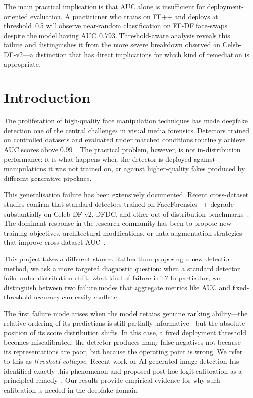 \documentclass[a4paper,12pt]{report}
\begin{document}
The main practical implication is that AUC alone is
insufficient for deployment-oriented evaluation.
A practitioner who trains on FF++ and deploys at
threshold~0.5 will observe near-random classification on
FF-DF face-swaps despite the model having AUC~0.793.
Threshold-aware analysis reveals this failure and
distinguishes it from the more severe breakdown observed
on Celeb-DF-v2---a distinction that has direct implications
for which kind of remediation is appropriate.

\chapter{Introduction}

The proliferation of high-quality face manipulation
techniques has made deepfake detection one of the central
challenges in visual media forensics.
Detectors trained on controlled datasets and evaluated
under matched conditions routinely achieve AUC scores
above 0.99~\cite{rossler2019,deepfakebench}.
The practical problem, however, is not in-distribution
performance: it is what happens when the detector is
deployed against manipulations it was not trained on, or
against higher-quality fakes produced by different
generative pipelines.

This generalisation failure has been extensively documented.
Recent cross-dataset studies confirm that standard detectors
trained on FaceForensics++ degrade substantially on
Celeb-DF-v2, DFDC, and other out-of-distribution
benchmarks~\cite{tolosana2020,deepfakebench,gend2025}.
The dominant response in the research community has been
to propose new training objectives, architectural
modifications, or data augmentation strategies that
improve cross-dataset AUC~\cite{gend2025,lsda2024,p_and_p2025}.

This project takes a different stance.
Rather than proposing a new detection method, we ask a
more targeted diagnostic question: when a standard detector
fails under distribution shift, what kind of failure is it?
In particular, we distinguish between two failure modes that
aggregate metrics like AUC and fixed-threshold accuracy
can easily conflate.

The first failure mode arises when the model retains genuine
ranking ability---the relative ordering of its predictions
is still partially informative---but the absolute position
of its score distribution shifts.
In this case, a fixed deployment threshold becomes
miscalibrated: the detector produces many false negatives
not because its representations are poor, but because the
operating point is wrong.
We refer to this as \emph{threshold collapse}.
Recent work on AI-generated image detection has identified
exactly this phenomenon and proposed post-hoc logit
calibration as a principled remedy~\cite{aigicalib2025}.
Our results provide empirical evidence for why such
calibration is needed in the deepfake domain.
\end{document}

